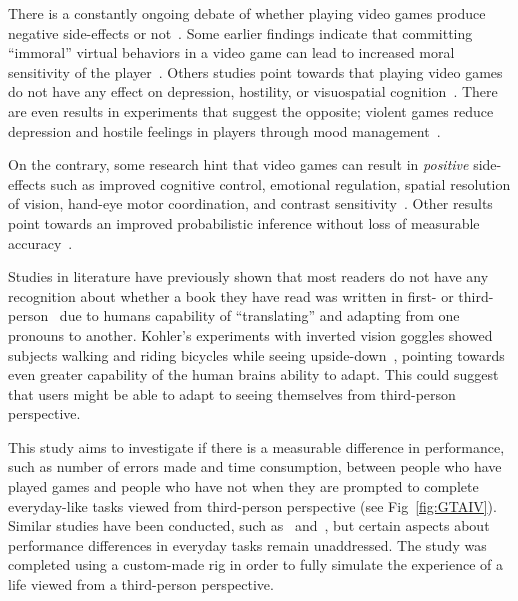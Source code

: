 \documentclass[runningheads,a4paper,oribibl]{llncs}
\begin{document}
There is a constantly ongoing debate of whether playing video games produce negative side-effects or not~\cite{tear2014video}. Some earlier findings indicate that committing ``immoral'' virtual behaviors in a video game can lead to increased moral sensitivity of the player~\cite{grizzard2014being}. Others studies point towards that playing video games do not have any effect on depression, hostility, or visuospatial cognition~\cite{valadez2012just}. There are even results in experiments that suggest the opposite; violent games reduce depression and hostile feelings in players through mood management~\cite{ferguson2015hitman}. 

On the contrary, some research hint that video games can result in \emph{positive} side-effects such as improved cognitive control, emotional regulation, spatial resolution of vision, hand-eye motor coordination, and contrast sensitivity~\cite{gong2015enhanced}. Other results point towards an improved probabilistic inference without loss of measurable accuracy~\cite{green2010improved}.

Studies in literature have previously shown that most readers do not have any recognition about whether a book they have read was written in first- or third-person~\cite{hagg2012nya} due to humans capability of ``translating'' and adapting from one pronouns to another. Kohler's experiments with inverted vision goggles showed subjects walking and riding bicycles while seeing upside-down~\cite{kohler1962goggles}, pointing towards even greater capability of the human brains ability to adapt. This could suggest that users might be able to adapt to seeing themselves from third-person perspective.

This study aims to investigate if there is a measurable difference in performance, such as number of errors made and time consumption, between people who have played games and people who have not when they are prompted to complete everyday-like tasks viewed from third-person perspective (see Fig~\ref{fig:GTAIV}). Similar studies have been conducted, such as~\cite{schmierbach2011exploring} and~\cite{nakamura20103pi}, but certain aspects about performance differences in everyday tasks remain unaddressed. The study was completed using a custom-made rig in order to fully simulate the experience of a life viewed from a third-person perspective.
\end{document}
